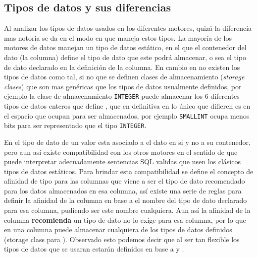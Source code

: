 \subsection{Tipos de datos y sus diferencias}
\label{subsection:datatypes}
Al analizar los tipos de datos usados en los diferentes motores, quizá la diferencia mas notoria se da en el modo en que \s maneja estos tipos. La mayoría de los motores de datos manejan un tipo de datos estático, en el que el contenedor del dato (la columna) define el tipo de dato que este podrá almacenar, o sea el tipo de dato declarado en la definición de la columna. En cambio en \s no existen los tipos de datos como tal, si no que se definen clases de almacenamiento\cite{sqlite:datatypes} (\textit{storage clases}) que son mas genéricas que los tipos de datos usualmente definidos, por ejemplo la clase de almacenamiento \verb=INTEGER= puede almacenar los 6 diferentes tipos de datos enteros que define \m , que en definitiva en lo único que difieren es en el espacio que ocupan para ser almacenados, por ejemplo \verb=SMALLINT= ocupa menos bits para ser representado que el tipo \verb=INTEGER=.

En \s el tipo de dato de un valor esta asociado a el dato en si y no a su contenedor, pero aun así existe compatibilidad con los otros motores en el sentido de que \s puede interpretar adecuadamente sentencias SQL validas que usen los clásicos tipos de datos estáticos. Para brindar esta compatibilidad se define el concepto de afinidad de tipo para las columnas que viene a ser el tipo de dato recomendado para los datos almacenados en esa columna, así existe una serie de reglas para definir la afinidad de la columna en base a el nombre del tipo de dato declarado para esa columna, pudiendo ser este nombre cualquiera. Aun así la afinidad de la columna \textbf{recomienda} un tipo de dato no lo exige para esa columna, por lo que en \s una columna puede almacenar cualquiera de los tipos de datos definidos (storage class para \s). Observado esto podemos decir que al ser \s tan flexible los tipos de datos que se usaran estarán definidos en base a \m y \p.
 
